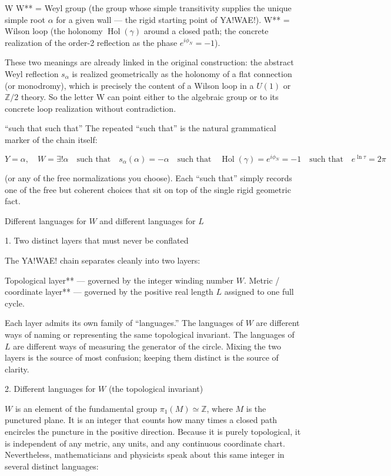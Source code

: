 W
W** = Weyl group (the group whose simple transitivity supplies the unique simple root \(\alpha\) for a given wall — the rigid starting point of YA!WAE!).
W** = Wilson loop (the holonomy \(\operatorname{Hol}(\gamma)\) around a closed path; the concrete realization of the order-2 reflection as the phase \(e^{i\phi_N}=-1\)).

These two meanings are already linked in the original construction: the abstract Weyl reflection \(s_\alpha\) is realized geometrically as the holonomy of a flat connection (or monodromy), which is precisely the content of a Wilson loop in a \(U(1)\) or \(\mathbb{Z}/2\) theory. So the letter W can point either to the algebraic group or to its concrete loop realization without contradiction.

“such that such that”
The repeated “such that” is the natural grammatical marker of the chain itself:

\[
Y=\alpha,\quad W=\exists!\alpha
\quad\text{such that}\quad
s_\alpha(\alpha)=-\alpha
\quad\text{such that}\quad
\operatorname{Hol}(\gamma)=e^{i\phi_N}=-1
\quad\text{such that}\quad
e^{\ln\tau}=2\pi
\]

(or any of the free normalizations you choose). Each “such that” simply records one of the free but coherent choices that sit on top of the single rigid geometric fact.

Different languages for \(W\) and different languages for \(L\)

1. Two distinct layers that must never be conflated

The YA!WAE! chain separates cleanly into two layers:

Topological layer** — governed by the integer winding number \(W\).
Metric / coordinate layer** — governed by the positive real length \(L\) assigned to one full cycle.

Each layer admits its own family of “languages.” The languages of \(W\) are different ways of naming or representing the same topological invariant. The languages of \(L\) are different ways of measuring the generator of the circle. Mixing the two layers is the source of most confusion; keeping them distinct is the source of clarity.

2. Different languages for \(W\) (the topological invariant)

\(W\) is an element of the fundamental group \(\pi_1(M)\simeq\mathbb{Z}\), where \(M\) is the punctured plane. It is an integer that counts how many times a closed path encircles the puncture in the positive direction. Because it is purely topological, it is independent of any metric, any units, and any continuous coordinate chart. Nevertheless, mathematicians and physicists speak about this same integer in several distinct languages:

